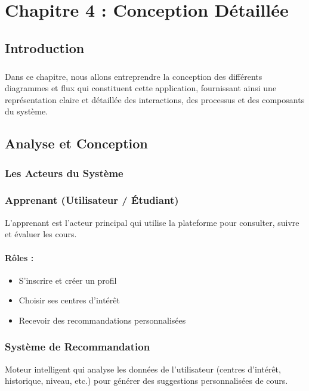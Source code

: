 \chapter{Chapitre 4 : Conception Détaillée}

\section*{Introduction}
{}

\paragraph{}\begin{spacing}{2}
Dans ce chapitre, nous allons entreprendre la conception des différents diagrammes et
flux qui constituent cette application, fournissant ainsi une représentation claire et détaillée
des interactions, des processus et des composants du système.
\end{spacing}
\newpage
\section{Analyse et Conception}
\subsection{Les Acteurs du Système}
\subsection*{Apprenant (Utilisateur / Étudiant)}
L’apprenant est l’acteur principal qui utilise la plateforme pour consulter, suivre et évaluer les cours.

\subsubsection*{Rôles :}
\begin{itemize}
    \item S’inscrire et créer un profil
    \item Choisir ses centres d’intérêt  
    \item Recevoir des recommandations personnalisées
\end{itemize}
\subsection*{Système de Recommandation}
Moteur intelligent qui analyse les données de l’utilisateur (centres d’intérêt, historique, niveau, etc.) pour générer des suggestions personnalisées de cours.

